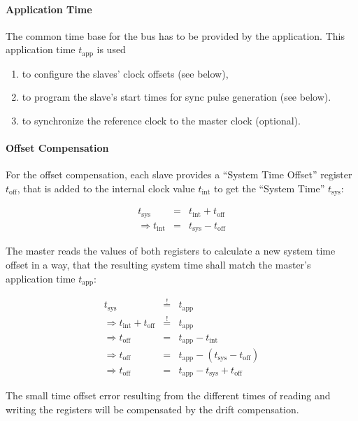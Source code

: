 \documentclass[a4paper,12pt,BCOR6mm,bibtotoc,idxtotoc]{scrbook}
\begin{document}
\paragraph{Application Time} The common time base for the bus has to be
provided by the application. This application time $t_\text{app}$ is used

\begin{enumerate}
\item to configure the slaves' clock offsets (see below),
\item to program the slave's start times for sync pulse generation (see
below).
\item to synchronize the reference clock to the master clock (optional).
\end{enumerate}

\paragraph{Offset Compensation} For the offset compensation, each slave
provides a ``System Time Offset'' register $t_\text{off}$, that is added to
the internal clock value $t_\text{int}$ to get the ``System Time''
$t_\text{sys}$:

\begin{eqnarray}
t_\text{sys} & = & t_\text{int} + t_\text{off} \\
\Rightarrow t_\text{int} & = & t_\text{sys} - t_\text{off} \nonumber
\end{eqnarray}

The master reads the values of both registers to calculate a new system time
offset in a way, that the resulting system time shall match the master's
application time $t_\text{app}$:

\begin{eqnarray}
t_\text{sys} & \stackrel{!}{=} & t_\text{app} \\
\Rightarrow t_\text{int} + t_\text{off} & \stackrel{!}{=} & t_\text{app} \nonumber \\
\Rightarrow t_\text{off} & = & t_\text{app} - t_\text{int} \nonumber \\
\Rightarrow t_\text{off} & = & t_\text{app} - (t_\text{sys} - t_\text{off}) \nonumber \\
\Rightarrow t_\text{off} & = & t_\text{app} - t_\text{sys} + t_\text{off}
\end{eqnarray}

The small time offset error resulting from the different times of reading and
writing the registers will be compensated by the drift compensation.
\end{document}
